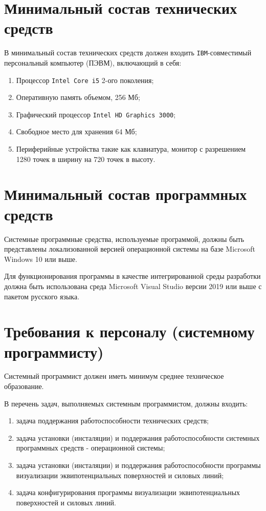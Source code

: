 \documentclass[14pt,a4paper,final]{extreport}
\begin{document}
\section{Минимальный состав технических средств}

В минимальный состав технических средств должен входить \texttt{IBM}-совместимый персональный компьютер
(ПЭВМ), включающий в себя:
\begin{enumerate}[label=\asbuk*),ref=\asbuk*]
	\item Процессор \texttt{Intel Core i5} 2-ого поколения;
	\item Оперативную память объемом, 256 Мб;
	\item Графический процессор \texttt{Intel HD Graphics 3000};
	\item Свободное место для хранения 64 Мб;
	\item Периферийные устройства такие как клавиатура, монитор с разрешением 1280 точек в ширину на 720 точек в высоту.
\end{enumerate}

\section{Минимальный состав программных средств}

Системные программные средства, используемые программой, должны быть представлены локализованной версией операционной системы на базе Microsoft Windows 10 или выше.

Для функционирования программы в качестве интегрированной среды разработки должна быть использована среда Microsoft Visual Studio версии 2019 или выше с пакетом русского языка. 

\section{Требования к персоналу (системному программисту)}

Системный программист должен иметь минимум среднее техническое образование.

В перечень задач, выполняемых системным программистом, должны входить:

\begin{enumerate}[label=\asbuk*),ref=\asbuk*]
	\item задача поддержания работоспособности технических средств;
	\item задача установки (инсталяции) и поддержания работоспособности системных программных средств - операционной системы;
	\item задача установки (инсталяции) и поддержания работоспособности программы визуализации эквипотенциальных поверхностей и силовых линий;
	\item задача конфигурирования программы визуализации эквипотенциальных поверхностей и силовых линий. 
\end{enumerate}
\end{document}
